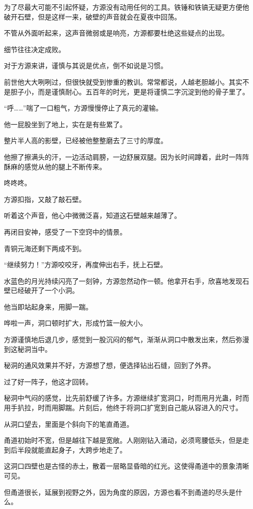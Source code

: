 \begin{this_body}
为了尽最大可能不引起怀疑，方源没有动用任何的工具。铁锤和铁镐无疑更方便他破开石壁，但是这样一来，破壁的声音就会在夏夜中回荡。

不管从外面听起来，这声音微弱或是响亮，方源都要杜绝这些疑点的出现。

细节往往决定成败。

对于方源来讲，谨慎与其说是优点，倒不如说是习惯。

前世他大大咧咧过，但很快就受到惨重的教训。常常都说，人越老胆越小。其实不是胆子小，而是谨慎耐心。五百年的时光，更是将谨慎二字沉淀到他的骨子里了。

“呼……”喘了一口粗气，方源慢慢停止了真元的灌输。

他一屁股坐到了地上，实在是有些累了。

整片半人高的影壁，已经被他整整磨去了三寸的厚度。

他擦了擦满头的汗，一边活动肩膀，一边舒展双腿。因为长时间蹲着，此时一阵阵酥麻的感觉从他的腿上不断传来。

咚咚咚。

方源扣指，又敲了敲石壁。

听着这个声音，他心中微微泛喜，知道这石壁越来越薄了。

再闭目安神，感受了一下空窍中的情景。

青铜元海还剩下两成不到。

“继续努力！”方源咬咬牙，再度伸出右手，抚上石壁。

水蓝色的月光持续闪亮了一刻钟，方源忽然动作一顿。他拿开右手，欣喜地发现石壁已经破开了一个小洞。

他当即站起身来，用脚一踹。

哗啦一声，洞口顿时扩大，形成竹篮一般大小。

方源谨慎地后退几步，感觉到一股沉闷的郁气，渐渐从洞口中散发出来，然后弥漫到这秘洞当中。

秘洞的通风效果并不好，方源想了想，便选择钻出石缝，回到了外界。

过了好一阵子，他这才回转。

秘洞中气闷的感觉，比先前舒缓了许多。方源继续扩宽洞口，时而用月光蛊，时而用手扒拉，时而用脚踹。片刻后，他终于将洞口扩宽到自己能从容进入的尺寸。

从洞口望去，里面是个斜向下的笔直甬道。

甬道初始时不宽，但是越往下越是宽敞。人刚刚钻入涌动，必须弯腰低头，但是走到后半段就能直起身子，大跨步地走了。

这洞口四壁也是古怪的赤土，散着一层略显昏暗的红光。这使得甬道中的景象清晰可见。

但甬道很长，延展到视野之外，因为角度的原因，方源也看不到甬道的尽头是什么。


\end{this_body}
